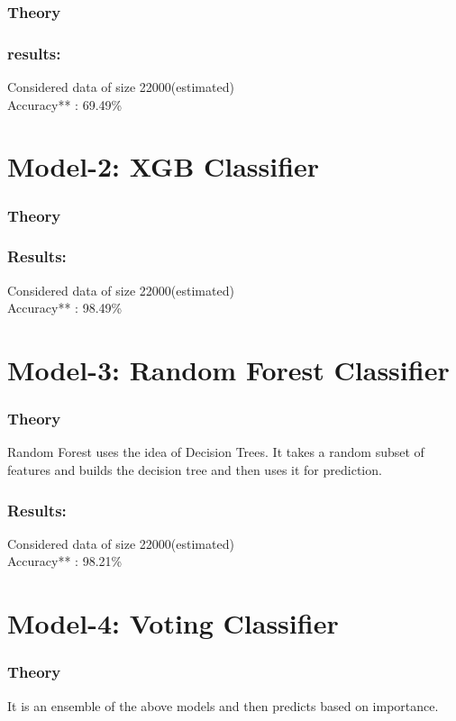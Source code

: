 \documentclass{scrreprt}
\begin{document}
\subsubsection{Theory}

\subsubsection{results:}
	Considered data of size 22000(estimated) \\
	Accuracy** : 69.49\%

\section{Model-2: XGB Classifier}
	

\subsubsection{Theory}

\subsubsection{Results:}
	Considered data of size 22000(estimated) \\
	Accuracy** : 98.49\%


\section{Model-3: Random Forest Classifier}

\subsubsection{Theory}
Random Forest uses the idea of Decision Trees. It takes a random subset of features and builds the decision tree and then uses it for prediction.

\subsubsection{Results:}
	Considered data of size 22000(estimated) \\
	Accuracy** : 98.21\%

\section{Model-4: Voting Classifier}

\subsubsection{Theory}
It is an ensemble of the above models and then predicts based on importance.
\end{document}

